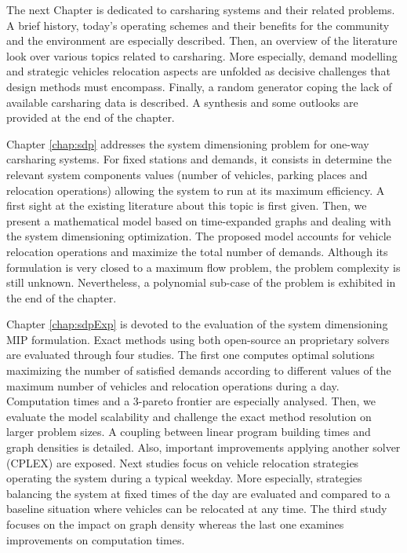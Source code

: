 \begin{bibunit}[ieeetr]
\medskip
The next Chapter is dedicated to carsharing systems and their related problems.
A brief history, today's operating schemes and their benefits for the community and the environment are especially described.
Then, an overview of the literature look over various topics related to carsharing.
More especially, demand modelling and strategic vehicles relocation aspects are unfolded as decisive challenges that design methods must encompass.
Finally, a random generator coping the lack of available carsharing data is described.
A synthesis and some outlooks are provided at the end of the chapter.


\medskip
Chapter \ref{chap:sdp} addresses the system dimensioning problem for one-way carsharing systems.
For fixed stations and demands, it consists in determine the relevant system components values (number of vehicles, parking places and relocation operations) allowing the system to run at its maximum efficiency.
A first sight at the existing literature about this topic is first given.
Then, we present a mathematical model based on time-expanded graphs and dealing with the system dimensioning optimization.
The proposed model accounts for vehicle relocation operations and maximize the total number of demands.
Although its formulation is very closed to a maximum flow problem, the problem complexity is still unknown.
Nevertheless, a polynomial sub-case of the problem is exhibited in the end of the chapter.

\medskip
Chapter \ref{chap:sdpExp} is devoted to the evaluation of the system dimensioning MIP formulation.
Exact methods using both open-source an proprietary solvers are evaluated through four studies.
The first one computes optimal solutions maximizing the number of satisfied demands according to different values of the maximum number of vehicles and relocation operations during a day.
Computation times and a 3-pareto frontier are especially analysed.
Then, we evaluate the model scalability and challenge the exact method resolution on larger problem sizes.
A coupling between linear program building times and graph densities is detailed.
Also, important improvements applying another solver (CPLEX) are exposed.
Next studies focus on vehicle relocation strategies operating the system during a typical weekday.
More especially, strategies balancing the system at fixed times of the day are evaluated and compared to a baseline situation where vehicles can be relocated at any time.
The third study focuses on the impact on graph density whereas the last one examines improvements on computation times.



\end{bibunit}
